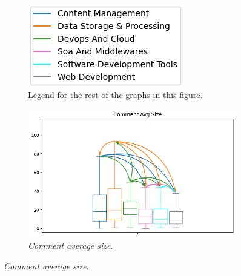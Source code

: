 \documentclass[10pt,a4paper,twocolumn]{article}
\begin{document}
\begin{figure}
    \centering
    \begin{subfigure}{.35\textwidth}
      \centering
      \includegraphics[width=\linewidth]{rq2_mw/domlegend.png}
      \caption{Legend for the rest of the graphs in this figure.}
    \end{subfigure}
    \begin{subfigure}{.4\textwidth}
      \centering
      \includegraphics[width=\linewidth]{rq2_mw/comment avg size_high_conf_plot_arrows.png}
      \caption{\textit{Comment average size}.}
    \end{subfigure}
    

\end{figure}
\end{document}
